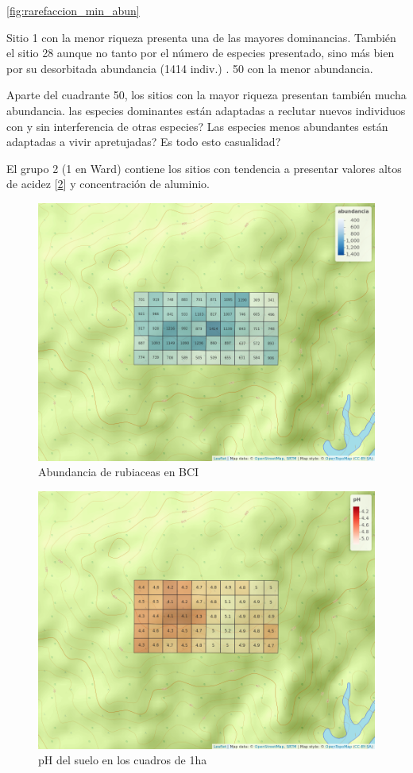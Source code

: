 \documentclass[11pt,]{article}
\begin{document}
 \ref{fig:rarefaccion_min_abun}

Sitio 1 con la menor riqueza presenta una de las mayores dominancias.
También el sitio 28 aunque no tanto por el número de especies
presentado, sino más bien por su desorbitada abundancia (1414 indiv.) .
50 con la menor abundancia.

Aparte del cuadrante 50, los sitios con la mayor riqueza presentan
también mucha abundancia. las especies dominantes están adaptadas a
reclutar nuevos individuos con y sin interferencia de otras especies?
Las especies menos abundantes están adaptadas a vivir apretujadas? Es
todo esto casualidad?

El grupo 2 (1 en Ward) contiene los sitios con tendencia a presentar
valores altos de acidez {[}\ref{fig:mapa_cuadros_ph}{]} y concentración
de aluminio.

\begin{figure}
\centering
\includegraphics{mapa_cuadros_abun_rubic.png}
\caption{Abundancia de rubiaceas en BCI
\label{fig:mapa_cuadros_abun_rubic}}
\end{figure}

\begin{figure}
\centering
\includegraphics{mapa_cuadros_ph.png}
\caption{pH del suelo en los cuadros de 1ha \label{fig:mapa_cuadros_ph}}
\end{figure}
\end{document}
